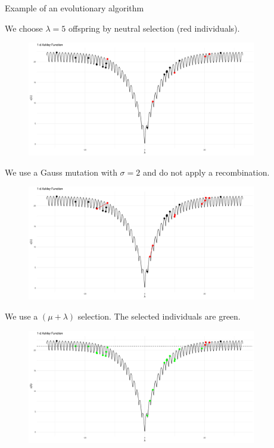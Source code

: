 \begin{frame}[allowframebreaks]{Example of an evolutionary algorithm}
\framebreak

We choose $\lambda = 5$ offspring by neutral selection (red individuals).

\begin{center}
\begin{figure}
\includegraphics[width=\textwidth, height=5cm]{images/ea_ex3.png}
\end{figure}
\end{center}

\framebreak

We use a Gauss mutation with $\sigma = 2$ and do not apply a recombination.
 \begin{center}
    \begin{figure}
    \includegraphics[width=\textwidth, height=5cm]{images/ea_ex4.png}
    \end{figure}
    \end{center}

  \framebreak

We use a $(\mu + \lambda)$ selection. The selected individuals are green.

  \begin{center}
    \begin{figure}
      \includegraphics[width=\textwidth, height=5cm]{images/ea_ex5.png}
    \end{figure}
  \end{center}


\end{frame}


